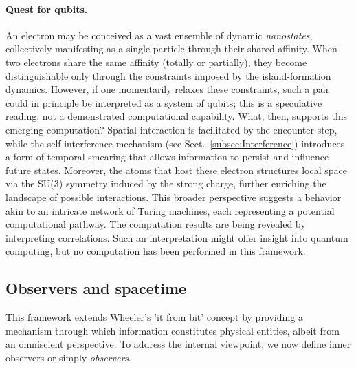 \documentclass{ijuc}
\begin{document}
\paragraph{Quest for qubits.} \label{subsection:qubits}
An electron may be conceived as a vast ensemble of dynamic \textit{nanostates}, collectively manifesting as a single particle through their shared affinity.
When two electrons share the same affinity (totally or partially), they become distinguishable only through the constraints imposed by the island-formation dynamics.
However, if one momentarily relaxes these constraints, such a pair could in principle be interpreted as a system of qubits; this is a speculative reading, not a demonstrated computational capability.
What, then, supports this emerging computation?
Spatial interaction is facilitated by the encounter step, while the self-interference mechanism (see Sect.~\ref{subsec:Interference}) introduces a form of temporal smearing that allows information to persist and influence future states.
Moreover, the atoms that host these electron structures local space via the SU(3) symmetry induced by the strong charge, further enriching the landscape of possible interactions.
This broader perspective suggests a behavior akin to an intricate network of Turing machines, each representing a potential computational pathway.
The computation results are being revealed by interpreting correlations.
Such an interpretation might offer insight into quantum computing, but no computation has been performed in this framework.
\subsection{Observers and spacetime}\label{subsec:observers}
This framework extends Wheeler's 'it from bit' concept by providing a mechanism through which information constitutes physical entities, albeit from an omniscient perspective.
To address the internal viewpoint, we now define inner observers or simply \textit{observers}.
\end{document}
